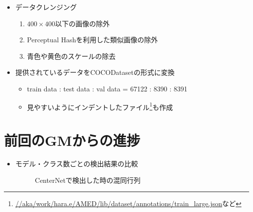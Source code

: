 \documentclass[a4j]{ujarticle}
\begin{document}
        \begin{itemize}
            \item データクレンジング
            \begin{enumerate}
                \item $400\times400$以下の画像の除外
                \item Perceptual Hashを利用した類似画像の除外
                \item 青色や黄色のスケールの除去
            \end{enumerate}

            \item 提供されているデータをCOCODatasetの形式に変換
            \begin{itemize}
                \item train data : test data : val data = 67122 : 8390 : 8391
                \item 見やすいようにインデントしたファイル\footnote{\url{//aka/work/hara.e/AMED/lib/dataset/annotations/train_large.json}など}も作成
            \end{itemize}
        \end{itemize}

\clearpage

    \section{前回のGMからの進捗}
        \begin{itemize}
            \item モデル・クラス数ごとの検出結果の比較

            \begin{figure}[!h]
                \centering
                \caption{CenterNet\cite{centernet}で検出した時の混同行列}
            \end{figure}
        \end{itemize}
\end{document}
